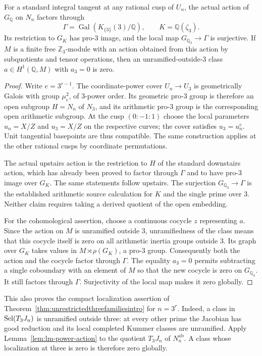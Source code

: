 \begin{lemma}
\label{lem:lm-power-action}
For a standard integral tangent at any rational cusp of $U_n$,
the actual action of $G_{\mathbb Q}$ on $N_n$ factors through
\[
 \Gamma=\operatorname{Gal}(K_{\{3\}}(3)/\mathbb Q),
 \qquad K=\mathbb Q(\zeta_3).
\]
Its restriction to $G_K$ has pro-$3$ image, and the local map
$G_{\mathbb Q_3}\to\Gamma$ is surjective.
If $M$ is a finite free $\mathbb Z_3$-module with an action
obtained from this action by subquotients and tensor operations,
then an unramified-outside-$3$ class
$a\in H^1(\mathbb Q,M)$ with $a_3=0$ is zero.
\end{lemma}
\begin{proof}
Write $e=3^{r-1}$.  The coordinate-power cover
$U_n\to U_3$ is geometrically Galois with group $\mu_e^2$,
of $3$-power order.  Its geometric pro-$3$ group is therefore
an open subgroup $H=N_n$ of $N_3$, and its arithmetic
pro-$3$ group is the corresponding open arithmetic subgroup.
At the cusp $(0:-1:1)$ choose the local parameters
$u_n=X/Z$ and $u_3=X/Z$ on the respective curves; the cover
satisfies $u_3=u_n^e$.  Unit tangential basepoints are thus
compatible.  The same construction applies at the other
rational cusps by coordinate permutations.

The actual upstairs action is the restriction to $H$ of the
standard downstairs action, which has already been proved to
factor through $\Gamma$ and to have pro-$3$ image over $G_K$.
The same statements follow upstairs.  The surjection
$G_{\mathbb Q_3}\to\Gamma$ is the established arithmetic
source calculation for $K$ and the single prime over $3$.
Neither claim requires taking a derived quotient of the
open embedding.

For the cohomological assertion, choose a continuous cocycle
$z$ representing $a$.  Since the action on $M$ is unramified
outside $3$, unramifiedness of the class means that this
cocycle itself is zero on all arithmetic inertia groups
outside $3$.  Its graph over $G_K$ takes values in
$M\rtimes\rho(G_K)$, a pro-$3$ group.  Consequently both
the action and the cocycle factor through $\Gamma$.
The equality $a_3=0$ permits subtracting a single coboundary
with an element of $M$ so that the new cocycle is zero on
$G_{\mathbb Q_3}$.  It still factors through $\Gamma$.
Surjectivity of the local map makes it zero globally.
\end{proof}

This also proves the compact localization assertion of
Theorem~\ref{thm:unrestrictedthreefamiliesintro} for $n=3^r$.
Indeed, a class in $\operatorname{Sel}(T_3J_n)$ is unramified outside three:
at every other prime the Jacobian has good reduction and its local
completed Kummer classes are unramified. Apply
Lemma~\ref{lem:lm-power-action} to the quotient $T_3J_n$ of
$N_n^{\mathrm{ab}}$. A class whose localization at three is zero
is therefore zero globally.

